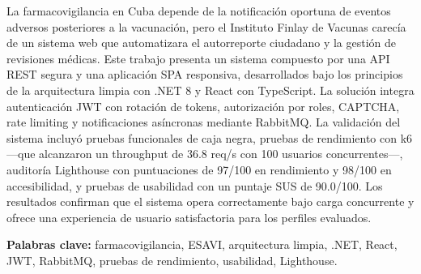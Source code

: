 
\begin{resumen}
La farmacovigilancia en Cuba depende de la notificación oportuna de eventos adversos posteriores a la vacunación, pero el Instituto Finlay de Vacunas carecía de un sistema web que automatizara el autorreporte ciudadano y la gestión de revisiones médicas. 
Este trabajo presenta un sistema compuesto por una API REST segura y una aplicación SPA responsiva, desarrollados bajo los principios de la arquitectura limpia con .NET 8 y React con TypeScript. 
La solución integra autenticación JWT con rotación de tokens, autorización por roles, CAPTCHA, rate limiting y notificaciones asíncronas mediante RabbitMQ. 
La validación del sistema incluyó pruebas funcionales de caja negra, pruebas de rendimiento con k6 —que alcanzaron un throughput de 36.8 req/s con 100 usuarios concurrentes—, auditoría Lighthouse con puntuaciones de 97/100 en rendimiento y 98/100 en accesibilidad, y pruebas de usabilidad con un puntaje SUS de 90.0/100.
Los resultados confirman que el sistema opera correctamente bajo carga concurrente y ofrece una experiencia de usuario satisfactoria para los perfiles evaluados.

\vspace{0.5cm}
\noindent\textbf{Palabras clave:} farmacovigilancia, ESAVI, arquitectura limpia, .NET, React, JWT, RabbitMQ, pruebas de rendimiento, usabilidad, Lighthouse.
\end{resumen}

\begin{abstract}
Pharmacovigilance in Cuba relies on the timely reporting of adverse events following immunization, yet the Finlay Vaccine Institute lacked a web-based system to automate citizen self-reporting and medical review management. This work presents a system composed of a secure REST API and a responsive SPA, developed under Clean Architecture principles with .NET 8 and React with TypeScript. The solution integrates JWT authentication with token rotation, role-based authorization, CAPTCHA, rate limiting, and asynchronous notifications via RabbitMQ. The system was validated through black-box functional testing, load testing with k6 —achieving a throughput of 36.8 req/s with 100 concurrent users—, a Lighthouse audit scoring 97/100 in performance and 98/100 in accessibility, and usability testing with a SUS score of 90.0/100. Results confirm that the system operates correctly under concurrent load and provides a satisfactory user experience for the evaluated profiles.

\vspace{0.5cm}
\noindent\textbf{Keywords:} pharmacovigilance, adverse events following immunization, Clean Architecture, .NET, React, JWT, RabbitMQ, performance testing, usability, Lighthouse.
\end{abstract}